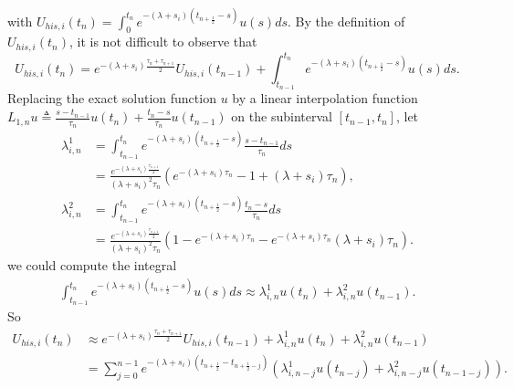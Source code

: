 \documentclass[10pt, reqno]{amsart}
\theoremstyle{remark}
\theoremstyle{definition}
\numberwithin{table}{section}
\begin{document}
with $U_{h i s,  i}\left(t_n\right)=\int_0^{t_{n}} e^{-\left(\lambda+s_i\right)\left(t_{n+\frac{1}{2}}-s\right)} u(s) d s$.  By the definition of $U_{h i s,  i}\left(t_n\right)$,  it is not difficult to observe that
$$
U_{h i s,  i}\left(t_n\right)=e^{-\left(\lambda+s_i\right) \frac{\tau_n+\tau_{n+1}}{2}} U_{h i s,  i}\left(t_{n-1}\right)+\int_{t_{n-1}}^{t_{n}} e^{-\left(\lambda+s_i\right)\left(t_{n+\frac{1}{2}}-s\right)} u(s) d s . 
$$
Replacing the exact solution function $u$ by a linear interpolation function $L_{1,  n} u \triangleq{} \frac{s-t_{n-1}}{\tau_{n}}u(t_{n})+\frac{t_{n}-s}{\tau_{n}}u(t_{n-1})$ on the subinterval $\left[t_{n-1},  t_{n}\right]$,  let 
\begin{equation}\label{lambda}
    \begin{aligned}
        \lambda_{i, n}^1&=\int_{t_{n-1}}^{t_{n}} e^{-\left(\lambda+s_i\right)\left(t_{n+\frac{1}{2}}-s\right)} \frac{s-t_{n-1}}{\tau_{n}} d s\\
        &=\frac{e^{-(\lambda+s_i)\frac{\tau_{n+1}}{2}}}{(\lambda+s_i)^2\tau_{n}}\left(e^{-\left(\lambda+s_i\right) \tau_{n}}-1+\left(\lambda+s_i\right) \tau_{n}\right), \\
        \lambda_{i, n}^{2}&=\int_{t_{n-1}}^{t_{n}} e^{-\left(\lambda+s_i\right)\left(t_{n+\frac{1}{2}}-s\right)} \frac{t_{n}-s}{\tau_{n}} d s\\
&=\frac{e^{-(\lambda+s_i)\frac{\tau_{n+1}}{2}}}{(\lambda+s_i)^2\tau_{n}}\left(1-e^{-\left(\lambda+s_i\right) \tau_{n}}-e^{-\left(\lambda+s_i\right) \tau_{n}}\left(\lambda+s_i\right) \tau_{n}\right). 
    \end{aligned}
\end{equation}
we could compute the integral
\begin{equation}
\begin{aligned}
\int_{t_{n-1}}^{t_{n}} e^{-\left(\lambda+s_i\right)\left(t_{n+\frac{1}{2}}-s\right)} u(s) d s \approx \lambda_{i, n}^{1}u(t_{n})+\lambda_{i, n}^{2}u(t_{n-1}). 
\end{aligned}
\end{equation}
So 
$$
\begin{aligned}
    U_{his, i}(t_n) &\approx e^{-\left(\lambda+s_i\right) \frac{\tau_n+\tau_{n+1}}{2}} U_{h i s,  i}\left(t_{n-1}\right)+\lambda_{i, n}^{1}u(t_{n})+\lambda_{i, n}^{2}u(t_{n-1})\\
    &=\sum_{j=0}^{n-1} e^{-\left(\lambda+s_i\right)\left(t_{n+\frac{1}{2}}-t_{{n+\frac{1}{2}}-j}\right)}\left(\lambda_{i,  n-j}^1 u(t_{n-j})+\lambda_{i,  n-j}^2 u(t_{n-1-j})\right). 
\end{aligned}
$$
\end{document}
